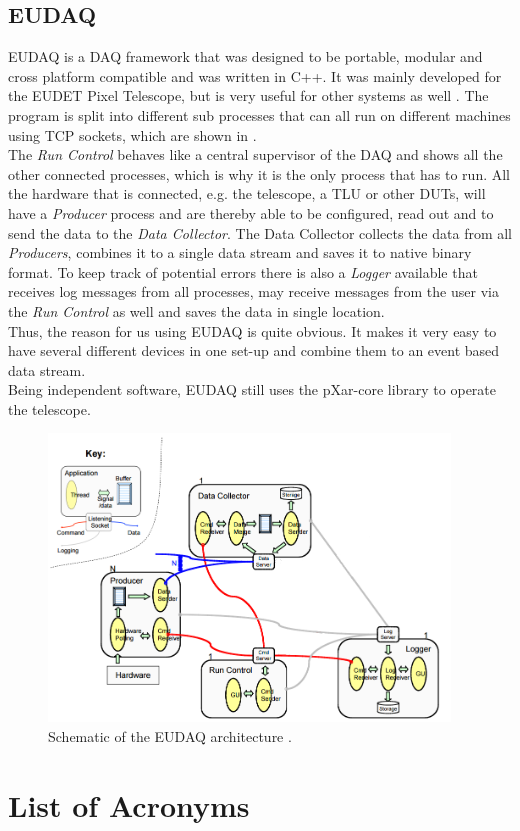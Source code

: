 \documentclass[british,11pt,a4paper]{memoir}
\begin{document}
\section{EUDAQ}
EUDAQ is a \ac{DAQ} framework that was designed to be portable, modular and cross platform compatible and was written in C++. It was mainly developed for the EUDET Pixel Telescope, but is very useful for other systems as well \cite{eudaq}. The program is split into different sub processes that can all run on different machines using \ac{TCP} sockets, which are shown in .\\
The \textit{Run Control} behaves like a central supervisor of the \ac{DAQ} and shows all the other connected processes, which is why it is the only process that has to run. All the hardware that is connected, e.g. the telescope, a \ac{TLU} or other \ac{DUT}s, will have a \textit{Producer} process and are thereby able to be configured, read out and to send the data to the \textit{Data Collector}. The Data Collector collects the data from all \textit{Producers}, combines it to a single data stream and saves it to native binary format. To keep track of potential errors there is also a \textit{Logger} available that receives log messages from all processes, may receive messages from the user via the \textit{Run Control} as well and saves the data in single location.\\
Thus, the reason for us using EUDAQ is quite obvious. It makes it very easy to have several different devices in one set-up and combine them to an event based data stream. \\
Being independent software, EUDAQ still uses the pXar-core library to operate the telescope.
\begin{figure}[ht]
	\includegraphics[width=0.95\textwidth]{eudaq}
	\caption{Schematic of the EUDAQ architecture \cite{eudaq}.}
	\label{p16}
\end{figure}
\chapter{List of Acronyms}



\end{document}
